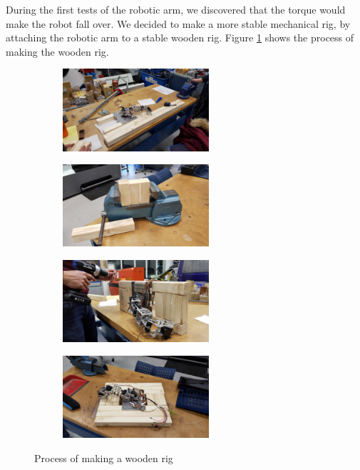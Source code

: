\documentclass[11pt,a4paper, titlepage]{article}
\begin{document}
	During the first tests of the robotic arm, we discovered that the torque would make the robot fall over. We decided to make a more stable mechanical rig, by attaching the robotic arm to a stable wooden rig. Figure \ref{fig:plank-rig} shows the process of making the wooden rig.
	
	\begin{figure}
	\centering
	
	
	\begin{subfigure}[t]{0.2\textwidth}
		
		\includegraphics[height=1.2in]{../Diagrams/plank1.jpg}
		
		
	\end{subfigure}%
	
	\begin{subfigure}[t]{0.2\textwidth}
		\centering
		\includegraphics[height=1.2in]{../Diagrams/plank2.jpg}
		
	\end{subfigure}%
	
	\begin{subfigure}[t]{0.2\textwidth}
		\includegraphics[height=1.2in]{../Diagrams/plank3.jpg}
		
	\end{subfigure}
	
	\begin{subfigure}[t]{0.2\textwidth}
		\includegraphics[height=1.2in]{../Diagrams/plank4.jpg}
		
	\end{subfigure}
	\caption{Process of making a wooden rig}
	\label{fig:plank-rig}	
	\end{figure}
	
\end{document}
